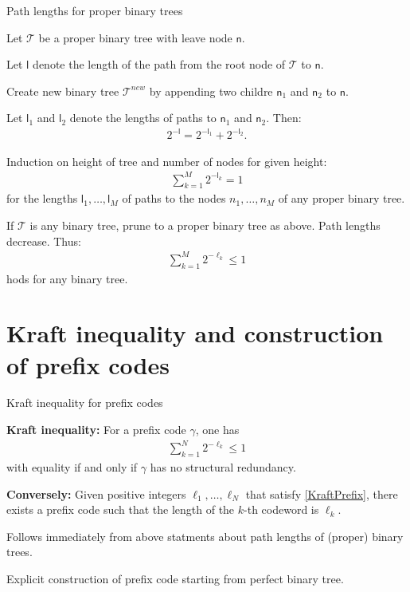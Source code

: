 \begin{frame}{Path lengths for proper binary trees}
\bit
\item Let $\mathcal{T}$ be a proper binary tree with leave node $\mathsf{n}$. 
\bit
\item Let $\mathsf{l}$ denote the length of the path from the root node of $\mathcal{T}$ to $\mathsf{n}$.
\item Create new binary tree $\mathcal{T}^{new}$ by appending two childre $\mathsf{n}_1$ and $\mathsf{n}_2$ to 
$\mathsf{n}$. 
\item Let $\mathsf{l}_1$ and $\mathsf{l}_2$ denote the lengths of paths to $\mathsf{n}_1$ and $\mathsf{n}_2$. Then:
\begin{align*}
2^{-\mathsf{l}}=2^{-\mathsf{l}_1}+2^{-\mathsf{l}_2}. 
\end{align*}
\eit 
\item [\iarrow] Induction on height of tree and number of nodes for given height: 
\begin{align*}
\sum_{k=1}^M2^{-\mathsf{l}_k}=1
\end{align*} 
for the lengths $\mathsf{l}_1,\dots,\mathsf{l}_M$ of paths to the nodes $n_1,\dots,n_M$ of any proper binary tree. 
\item [\iarrow] If $\mathcal{T}$ is any binary tree, prune to a proper binary tree as above. Path lengths decrease. Thus:  
\begin{align*}
\sum_{k=1}^M2^{-\ell_k}\leq 1
\end{align*}
hods for any binary tree. 
\eit 
\end{frame}

\section{Kraft inequality and construction of prefix codes}
\begin{frame}{Kraft inequality for prefix codes} 
\begin{theorem}
\bit 
\item \textbf{Kraft inequality:}
For a prefix code $\gamma$, one has 
\begin{align}\label{KraftPrefix}
\sum_{k=1}^N2^{-\ell_k}\leq 1
\end{align}
with equality if and only if $\gamma$ has no structural redundancy. 
\item \textbf{Conversely:} Given positive integers $\ell_1,\dots,\ell_N$ that satisfy \eqref{KraftPrefix}, there exists a prefix code such that the length of the $k$-th codeword is $\ell_k$. 
\eit 
\end{theorem} 
\bit
\item Follows immediately from above statments about path lengths of (proper) binary trees.
\eit
{}
\bit
\item Explicit construction of prefix code starting from perfect binary tree.
\eit
\end{frame}




